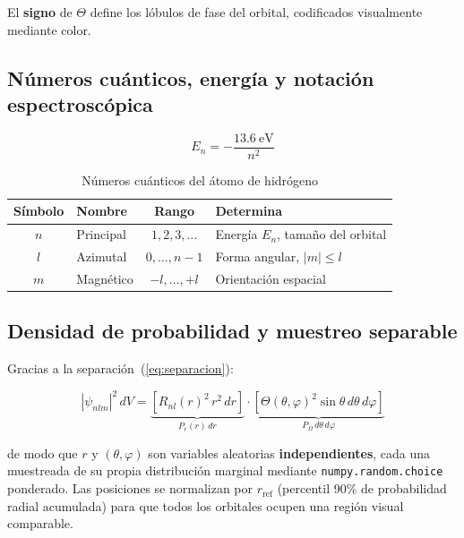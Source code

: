 \documentclass[12pt, a4paper]{article}
\begin{document}
El \textbf{signo} de $\Theta$ define los lóbulos de fase del orbital,
codificados visualmente mediante color.

\subsection{Números cuánticos, energía y notación espectroscópica}

\begin{equation}
  E_n = -\frac{13.6\ \text{eV}}{n^2}
  \label{eq:energia_bohr}
\end{equation}

\begin{table}[H]
  \centering
  \caption{Números cuánticos del átomo de hidrógeno}
  \begin{tabular}{clcl}
    \toprule
    Símbolo & Nombre & Rango & Determina \\
    \midrule
    $n$ & Principal & $1, 2, 3, \dots$ & Energía $E_n$, tamaño del orbital \\
    $l$ & Azimutal & $0,\dots,n-1$ & Forma angular, $|m|\le l$ \\
    $m$ & Magnético & $-l,\dots,+l$ & Orientación espacial \\
    \bottomrule
  \end{tabular}
  \label{tab:numeros_cuanticos}
\end{table}

\subsection{Densidad de probabilidad y muestreo separable}
\label{sec:muestreo}

Gracias a la separación~(\ref{eq:separacion}):

\begin{equation}
  |\psi_{nlm}|^2\,dV
  = \underbrace{\left[R_{nl}(r)^2\,r^2\,dr\right]}_{P_r(r)\,dr}
  \cdot
  \underbrace{\left[\Theta(\theta,\varphi)^2\sin\theta\,d\theta\,d\varphi\right]}_{P_\Omega\,d\theta\,d\varphi}
  \label{eq:factorizacion}
\end{equation}

de modo que $r$ y $(\theta,\varphi)$ son variables aleatorias
\textbf{independientes}, cada una muestreada de su propia distribución
marginal mediante \texttt{numpy.random.choice} ponderado. Las
posiciones se normalizan por $r_{\text{ref}}$ (percentil 90\% de
probabilidad radial acumulada) para que todos los orbitales ocupen
una región visual comparable.
\end{document}
